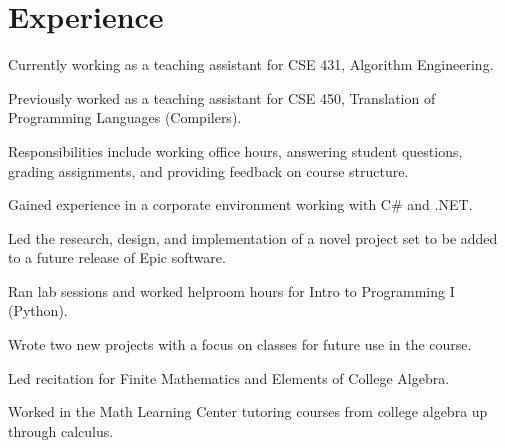 \documentclass[]{deedy-resume-openfont}
\begin{document}
\begin{minipage}[t]{0.66\textwidth} 


\section{Experience}

\vspace{\topsep} %
\begin{tightemize}
\item Currently working as a teaching assistant for CSE 431, Algorithm Engineering.
\item Previously worked as a teaching assistant for CSE 450, Translation of Programming Languages (Compilers).
\item Responsibilities include working office hours, answering student questions, grading assignments, and providing feedback on course structure.
\end{tightemize}
\sectionsep

\begin{tightemize}
\item Gained experience in a corporate environment working with C\# and .NET.
\item Led the research, design, and implementation of a novel project set to be added to a future release of Epic software.
\end{tightemize}
\sectionsep

\begin{tightemize}
\item Ran lab sessions and worked helproom hours for Intro to Programming I (Python).
\item Wrote two new projects with a focus on classes for future use in the course.
\end{tightemize}
\sectionsep

\begin{tightemize}
\item Led recitation for Finite Mathematics and Elements of College Algebra.
\item Worked in the Math Learning Center tutoring courses from college algebra up through calculus.
\end{tightemize}
\sectionsep


\end{minipage}
\end{document}
